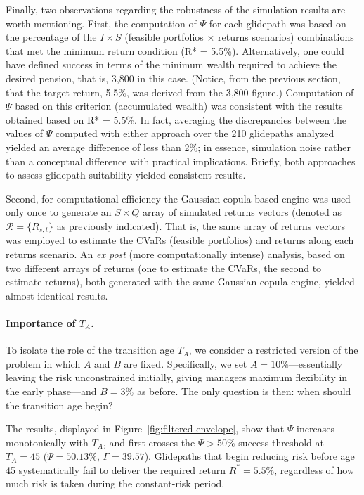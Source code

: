 \documentclass[11pt]{article}
\newcommand{\TA}{T_{A}}
\begin{document}
Finally, two observations regarding the robustness of the simulation results are worth mentioning.  First, the computation of $\Psi$ for each glidepath was based on the percentage  of the $I \times S$ (feasible portfolios $\times$ returns scenarios) combinations that met the minimum return condition (R* = 5.5\%).  Alternatively, one could have defined success in terms of the minimum wealth required to achieve the desired pension, that is, 3,800 in this case.  (Notice, from the previous section, that the target return, 5.5\%,  was derived from the 3,800 figure.)  Computation of $\Psi$ based on this criterion (accumulated wealth) was consistent with the results obtained based on R* = 5.5\%.  In fact, averaging the discrepancies between the values of $\Psi$ computed with either approach over the 210 glidepaths analyzed yielded an average difference of less than 2\%; in essence, simulation noise rather than a conceptual difference with  practical implications.  Briefly, both approaches to assess glidepath suitability yielded consistent results.

Second, for computational efficiency the Gaussian copula-based engine was used only once to generate an $S \times Q$ array of simulated returns vectors (denoted as $\mathcal{R}=\{R_{s,t}\}$ as previously  indicated).  That is, the same array of returns vectors was employed to estimate the CVaRs (feasible portfolios) and returns along each returns scenario.  An \textit{ex post} (more computationally intense) analysis, based on two different arrays of returns (one to estimate the CVaRs, the second to estimate returns), both generated with the same Gaussian copula engine, yielded almost identical results.





\paragraph{Importance of $\TA$.}
To isolate the role of the transition age $\TA$, we consider a restricted version of the problem in which $A$ and $B$ are fixed. Specifically, we set $A=10\%$---essentially leaving the risk unconstrained initially, giving managers maximum flexibility in the early phase---and $B=3\%$ as before. The only question is then: when should the transition age begin?

The results, displayed in Figure~\ref{fig:filtered-envelope}, show that $\Psi$ 
increases monotonically with $T_A$, and first crosses the $\Psi > 50\%$ success 
threshold at $T_A=45$ ($\Psi=50.13\%$, $\Gamma=39.57$). Glidepaths that begin 
reducing risk before age 45 systematically fail to deliver the required return 
$R^*=5.5\%$, regardless of how much risk is taken during the constant-risk 
period.
\end{document}
